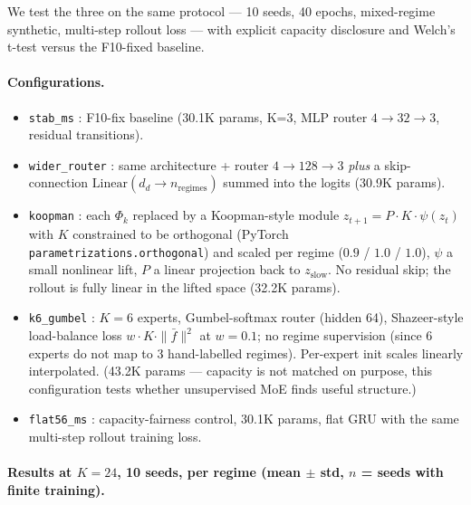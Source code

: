 \documentclass[11pt,a4paper]{article}
\begin{document}
We test the three on the same protocol --- 10 seeds, 40 epochs,
mixed-regime synthetic, multi-step rollout loss --- with explicit
capacity disclosure and Welch's t-test versus the F10-fixed baseline.

\paragraph{Configurations.}
\begin{itemize}[leftmargin=*]
\item \texttt{stab\_ms} : F10-fix baseline (30.1K params, K=3,
  MLP router $4{\to}32{\to}3$, residual transitions).
\item \texttt{wider\_router} : same architecture + router
  $4{\to}128{\to}3$ \emph{plus} a skip-connection
  $\text{Linear}(d_d \to n_{\text{regimes}})$ summed into the logits
  (30.9K params).
\item \texttt{koopman} : each $\Phi_k$ replaced by a Koopman-style
  module $z_{t+1} = P \cdot K \cdot \psi(z_t)$ with $K$ constrained
  to be orthogonal (PyTorch \texttt{parametrizations.orthogonal}) and
  scaled per regime ($0.9$ / $1.0$ / $1.0$), $\psi$ a small nonlinear
  lift, $P$ a linear projection back to $z_{\text{slow}}$. No residual
  skip; the rollout is fully linear in the lifted space (32.2K params).
\item \texttt{k6\_gumbel} : $K{=}6$ experts, Gumbel-softmax router
  (hidden 64), Shazeer-style load-balance loss
  $w \cdot K \cdot \|\bar f\|^2$ at $w{=}0.1$; no regime supervision
  (since 6 experts do not map to 3 hand-labelled regimes). Per-expert
  init scales linearly interpolated. (43.2K params --- capacity is
  not matched on purpose, this configuration tests whether unsupervised
  MoE finds useful structure.)
\item \texttt{flat56\_ms} : capacity-fairness control, 30.1K params,
  flat GRU with the same multi-step rollout training loss.
\end{itemize}

\paragraph{Results at $K{=}24$, 10 seeds, per regime
(mean $\pm$ std, $n$ = seeds with finite training).}
\end{document}
